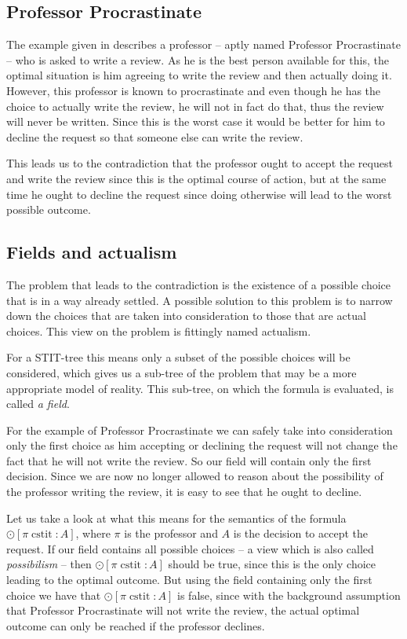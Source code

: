 \documentclass{article}
\newcommand{\cstit}{\operatorname{cstit}}
\begin{document}
\subsection{Professor Procrastinate}
The example given in \cite{mdl} describes a professor -- aptly named Professor Procrastinate -- who is asked to write a review. As he is the best person available for this, the optimal situation is him agreeing to write the review and then actually doing it. However, this professor is known to procrastinate and even though he has the choice to actually write the review, he will not in fact do that, thus the review will never be written. Since this is the worst case it would be better for him to decline the request so that someone else can write the review.

This leads us to the contradiction that the professor ought to accept the request and write the review since this is the optimal course of action, but at the same time he ought to decline the request since doing otherwise will lead to the worst possible outcome.

\subsection{Fields and actualism}
The problem that leads to the contradiction is the existence of a possible choice that is in a way already settled. A possible solution to this problem is to narrow down the choices that are taken into consideration to those that are actual choices. This view on the problem is fittingly named actualism.

For a STIT-tree this means only a subset of the possible choices will be considered, which gives us a sub-tree of the problem that may be a more appropriate model of reality. This sub-tree, on which the formula is evaluated, is called \emph{a field}.

For the example of Professor Procrastinate we can safely take into consideration only the first choice as him accepting or declining the request will not change the fact that he will not write the review. So our field will contain only the first decision. Since we are now no longer allowed to reason about the possibility of the professor writing the review, it is easy to see that he ought to decline.

Let us take a look at what this means for the semantics of the formula $\odot [\pi \cstit \colon A]$, where $\pi$ is the professor and $A$ is the decision to accept the request. If our field contains all possible choices -- a view which is also called \emph{possibilism} -- then $\odot [\pi \cstit \colon A]$ should be true, since this is the only choice leading to the optimal outcome. But using the field containing only the first choice we have that $\odot [\pi \cstit \colon A]$ is false, since with the background assumption that Professor Procrastinate will not write the review, the actual optimal outcome can only be reached if the professor declines.
\end{document}
